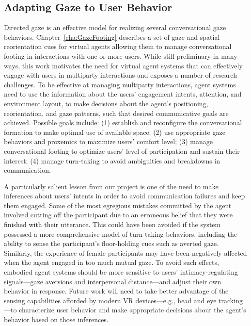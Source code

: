 \subsection{Adapting Gaze to User Behavior}

Directed gaze is an effective model for realizing several conversational gaze behaviors. Chapter~\ref{cha:GazeFooting} describes a set of gaze and spatial reorientation cues for virtual agents allowing them to manage conversational footing in interactions with one or more users. While still preliminary in many ways, this work motivates the need for virtual agent systems that can effectively engage with users in multiparty interactions and exposes a number of research challenges. To be effective at managing multiparty interactions, agent systems need to use the information about the users' engagement intents, attention, and environment layout, to make decisions about the agent's positioning, reorientation, and gaze patterns, such that desired communicative goals are achieved. Possible goals include: (1) establish and reconfigure the conversational formation to make optimal use of available space; (2) use appropriate gaze behaviors and proxemics to maximize users' comfort level; (3) manage conversational footing to optimize users' level of participation and sustain their interest; (4) manage turn-taking to avoid ambiguities and breakdowns in communication.

A particularly salient lesson from our project is one of the need to make inferences about users' intents in order to avoid communication failures and keep them engaged. Some of the most egregious mistakes committed by the agent involved cutting off the participant due to an erroneous belief that they were finished with their utterance. This could have been avoided if the system possessed a more comprehensive model of turn-taking behaviors, including the ability to sense the participant's floor-holding cues such as averted gaze. Similarly, the experience of female participants may have been negatively affected when the agent engaged in too much mutual gaze. To avoid such effects, embodied agent systems should be more sensitive to users' intimacy-regulating signals---gaze aversions and interpersonal distance---and adjust their own behavior in response. Future work will need to take better advantage of the sensing capabilities afforded by modern VR devices---e.g., head and eye tracking---to characterize user behavior and make appropriate decisions about the agent's behavior based on those inferences.

